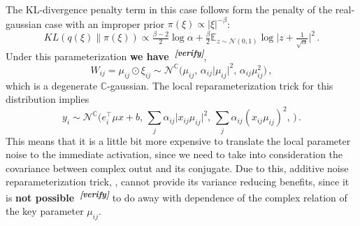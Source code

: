 \documentclass[a4paper,10pt]{article}
\newcommand{\attn}[2]{\textbf{\color{red} #2~\textsuperscript{\textit{[#1]}}}}
\newcommand{\verify}[1]{\attn{verify}{#1}}
\newcommand{\cplx}{\mathbb{C}}
\begin{document}
The KL-divergence penalty term in this case follows form the penalty of the real-gaussian
case with an improper prior $\pi(\xi)\propto \lvert \xi \rvert^{-\beta}$:
$$
KL(q(\xi)\| \pi(\xi))
  \propto \tfrac{\beta-2}2 \log \alpha
    + \tfrac\beta2 \mathbb{E}_{z\sim \mathcal{N}(0, 1)}
      \log \lvert z + \tfrac1{\sqrt{\alpha}} \rvert^2
  \,. $$
Under this parameterization \verify{we have},
$$
W_{ij} = \mu_{ij} \odot \xi_{ij}
  \sim \mathcal{N}^{\cplx} \bigl(
    \mu_{ij},
    \, \alpha_{ij} \lvert \mu_{ij} \rvert^2,
    \, \alpha_{ij} \mu_{ij}^2
  \bigr)
  \,, $$
which is a degenerate $\cplx$-gaussian. The local reparameterization trick for this
distribution implies
$$
y_i
  \sim \mathcal{N}^{\cplx}\bigl(
    e_i^\top \mu x + b,
    \, \sum_j \alpha_{ij} \lvert x_{ij} \mu_{ij}\rvert^2,
    \, \sum_j \alpha_{ij} (x_{ij} \mu_{ij})^2,
    \,
  \bigr)
  \,. $$
This means that it is a little bit more expensive to translate the local parameter
noise to the immediate activation, since we need to take into consideration the covariance
between complex outut and its conjugate. Due to this, additive noise reparameterization
trick, \cite{molchanov_variational_2017}, cannot provide its variance reducing benefits,
since it is \verify{not possible} to do away with dependence of the complex relation
of the key parameter $\mu_{ij}$.




\clearpage



\nocite{*}
\end{document}
